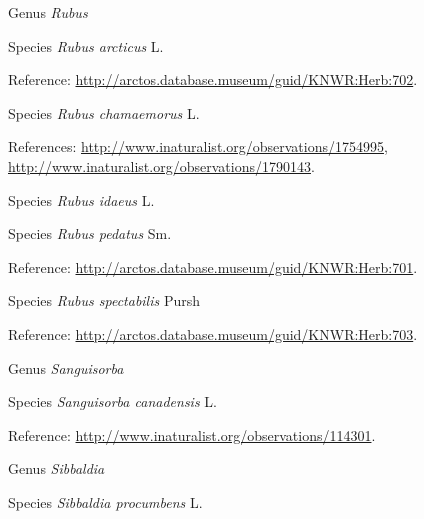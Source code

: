\documentclass[9pt, article]{memoir}
\begin{document}
\begin{multicols}{2}
\vspace{6pt}\noindent\hspace{30pt}Genus \textit{Rubus}


\vspace{6pt}\noindent\hspace{36pt}Species \textit{Rubus arcticus} L.


\vspace{6pt}Reference: 
\url{http://arctos.database.museum/guid/KNWR:Herb:702}.

\vspace{6pt}\noindent\hspace{36pt}Species \textit{Rubus chamaemorus} L.


\vspace{6pt}References: 
\url{http://www.inaturalist.org/observations/1754995}, 
\url{http://www.inaturalist.org/observations/1790143}.

\vspace{6pt}\noindent\hspace{36pt}Species \textit{Rubus idaeus} L.


\vspace{6pt}\noindent\hspace{36pt}Species \textit{Rubus pedatus} Sm.


\vspace{6pt}Reference: 
\url{http://arctos.database.museum/guid/KNWR:Herb:701}.

\vspace{6pt}\noindent\hspace{36pt}Species \textit{Rubus spectabilis} Pursh


\vspace{6pt}Reference: 
\url{http://arctos.database.museum/guid/KNWR:Herb:703}.

\vspace{6pt}\noindent\hspace{30pt}Genus \textit{Sanguisorba}


\vspace{6pt}\noindent\hspace{36pt}Species \textit{Sanguisorba canadensis} L.


\vspace{6pt}Reference: 
\url{http://www.inaturalist.org/observations/114301}.

\vspace{6pt}\noindent\hspace{30pt}Genus \textit{Sibbaldia}


\vspace{6pt}\noindent\hspace{36pt}Species \textit{Sibbaldia procumbens} L.



\end{multicols}
\end{document}
